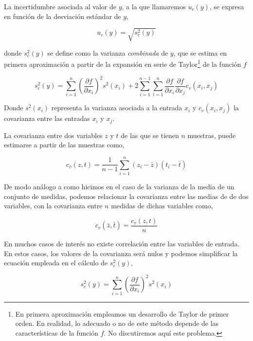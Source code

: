 La incertidumbre asociada al valor de $y$, a la que llamaremos $u_c(y)$, se expresa en función de la desviación estándar de $y$,  

\begin{equation*}
u_c(y) =\sqrt{s_c^2(y)}
\end{equation*}


donde  $s_c^2(y)$ se define como la  varianza \emph{combinada} de $y$, que se estima en primera aproximación a partir de la expansión en serie de Taylor\footnote{En primera aproximación empleamos un desarrollo de Taylor de primer orden. En realidad, lo adecuado o no de este método depende de las características de la función $f$. No discutiremos aquí este problema.} de la función $f$	

\begin{equation*}
s_c^2(y) = \sum_{i=1}^n\left(\frac{\partial f}{\partial x_i}\right)^2 s^2(x_i) + 2\sum_{i=1}^{n-1}\sum_{i=1}^n \frac{\partial f}{\partial x_i}\frac{\partial f}{\partial x_j} c_v(x_i,x_j)
\end{equation*}

Donde $s^2(x_i)$  representa la varianza asociada a la entrada $x_i$ y $c_v(x_i, x_j)$ la covarianza entre las entradas $x_i$ y $x_j$. 

La covarianza entre dos variables $z$ y $t$ de las que se tienen $n$ muestras, puede estimarse a partir de las muestras como,

\begin{equation*}
c_v(z,t) =\frac{1}{n-1}\sum_{i=1}^n(z_i-\bar{z})(t_i-\bar{t})
\end{equation*}

De modo análogo a como hicimos en el caso de la varianza de la media de un conjunto de medidas, podemos relacionar la covarianza entre las medias de  de dos variables, con la covarianza entre $n$ medidas de dichas variables como,

\begin{equation*}
c_v(\bar{z},\bar{t}) =\frac{c_v(z,t)}{n}
\end{equation*}

En muchos casos de interés no existe correlación entre las variables de entrada. En estos casos, los valores de la covarianza será nulos y podemos simplificar la ecuación empleada en el cálculo de $s_c^2(y)$,

\begin{equation*}
s_c^2(y) = \sum_{i=1}^n\left(\frac{\partial f}{\partial x_i}\right)^2 s^2(x_i)
\end{equation*}


